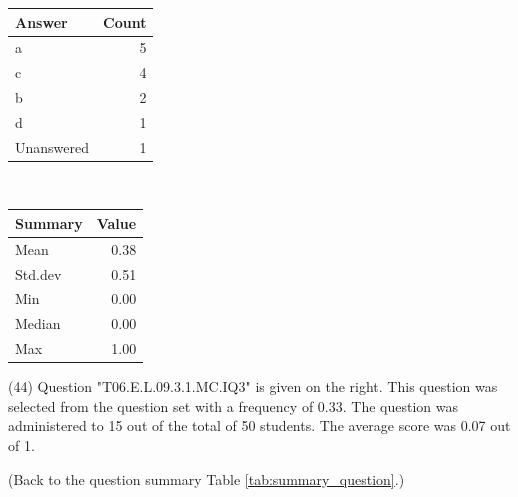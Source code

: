 \documentclass[12pt,english,nohyper]{tufte-handout}\usepackage[]{graphicx}\usepackage[]{color}
\begin{document}
\begin{center}%
\begin{tabular}{lr}
  \hline
Answer & Count \\ 
  \hline
a &   5 \\ 
  c &   4 \\ 
  b &   2 \\ 
  d &   1 \\ 
  Unanswered &   1 \\ 
   \hline
\end{tabular}
~~~~~~~~%
\begin{tabular}{lr}
  \hline
Summary & Value \\ 
  \hline
Mean & 0.38 \\ 
  Std.dev & 0.51 \\ 
  Min & 0.00 \\ 
  Median & 0.00 \\ 
  Max & 1.00 \\ 
   \hline
\end{tabular}
\end{center}\newpage{} (44) Question "T06.E.L.09.3.1.MC.IQ3" is given on the right. This question was selected from the question set with a frequency of 0.33. The question was administered to 15 out of the total of 50 students. The average score was 0.07 out of 1.

 (Back to the question summary Table \ref{tab:summary_question}.)
\end{document}
